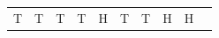 {\begin{tabular}[t]{|l|l|l|l|l|l|l|l|l|l|}
    
        T &
    
    
        T &
    
    
        T &
    
    
        T &
    
    
        H &
    
    
        T &
    
    
        T &
    
    
        H &
    
    
        H%
     \tabularnewline\cline{1-1}\cline{2-2}\cline{3-3}\cline{4-4}\cline{5-5}\cline{6-6}\cline{7-7}\cline{8-8}\cline{9-9}\cline{10-10}
    

\end{tabular}}
